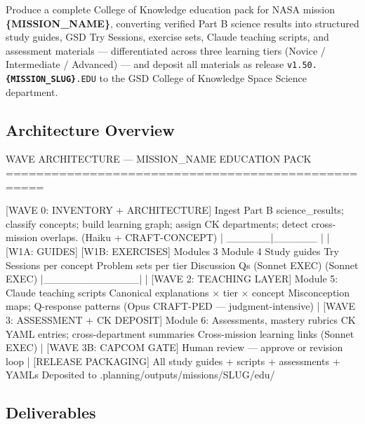 \documentclass[11pt,letterpaper]{article}
\newcommand{\param}[1]{\textcolor{paramred}{\textbf{\{#1\}}}}
\begin{document}
Produce a complete College of Knowledge education pack for NASA mission \param{MISSION\_NAME}, converting verified Part B science results into structured study guides, GSD Try Sessions, exercise sets, Claude teaching scripts, and assessment materials --- differentiated across three learning tiers (Novice / Intermediate / Advanced) --- and deposit all materials as release \texttt{v1.50.\param{MISSION\_SLUG}.EDU} to the GSD College of Knowledge Space Science department.

\subsection{Architecture Overview}

\begin{asciibox}
WAVE ARCHITECTURE — {MISSION_NAME} EDUCATION PACK
===================================================

  [WAVE 0: INVENTORY + ARCHITECTURE]
  Ingest Part B science_results; classify concepts;
  build learning graph; assign CK departments;
  detect cross-mission overlaps.
  (Haiku + CRAFT-CONCEPT)
         |
   ______|______
  |             |
[W1A: GUIDES]  [W1B: EXERCISES]
 Modules 3      Module 4
 Study guides   Try Sessions
 per concept    Problem sets
 per tier       Discussion Qs
 (Sonnet EXEC)  (Sonnet EXEC)
  |_____________|
         |
  [WAVE 2: TEACHING LAYER]
  Module 5: Claude teaching scripts
  Canonical explanations × tier × concept
  Misconception maps; Q-response patterns
  (Opus CRAFT-PED — judgment-intensive)
         |
  [WAVE 3: ASSESSMENT + CK DEPOSIT]
  Module 6: Assessments, mastery rubrics
  CK YAML entries; cross-department summaries
  Cross-mission learning links
  (Sonnet EXEC)
         |
  [WAVE 3B: CAPCOM GATE]
  Human review — approve or revision loop
         |
  [RELEASE PACKAGING]
  All study guides + scripts + assessments + YAMLs
  Deposited to .planning/outputs/missions/{SLUG}/edu/
\end{asciibox}

\subsection{Deliverables}
\end{document}
